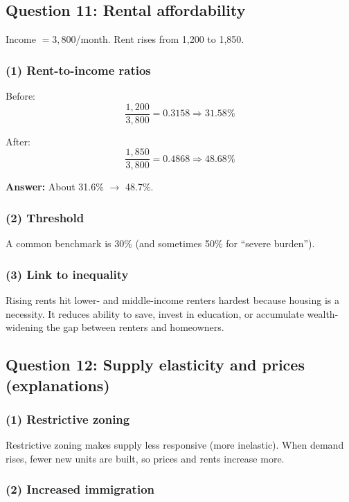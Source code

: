 \documentclass[11pt]{article}
\begin{document}
\subsection*{Question 11: Rental affordability}

Income \(=3{,}800\)/month. Rent rises from 1,200 to 1,850.

\subsubsection*{(1) Rent-to-income ratios}

Before:
\[
\frac{1{,}200}{3{,}800}=0.3158 \Rightarrow 31.58\%
\]

After:
\[
\frac{1{,}850}{3{,}800}=0.4868 \Rightarrow 48.68\%
\]

\textbf{Answer:} About 31.6\% \(\rightarrow\) 48.7\%.

\subsubsection*{(2) Threshold}

A common benchmark is 30\% (and sometimes 50\% for “severe burden”).

\subsubsection*{(3) Link to inequality}

Rising rents hit lower- and middle-income renters hardest because housing is a necessity. It reduces ability to save, invest in education, or accumulate wealth-widening the gap between renters and homeowners.

\subsection*{Question 12: Supply elasticity and prices (explanations)}

\subsubsection*{(1) Restrictive zoning}

Restrictive zoning makes supply less responsive (more inelastic). When demand rises, fewer new units are built, so prices and rents increase more.

\subsubsection*{(2) Increased immigration}
\end{document}
